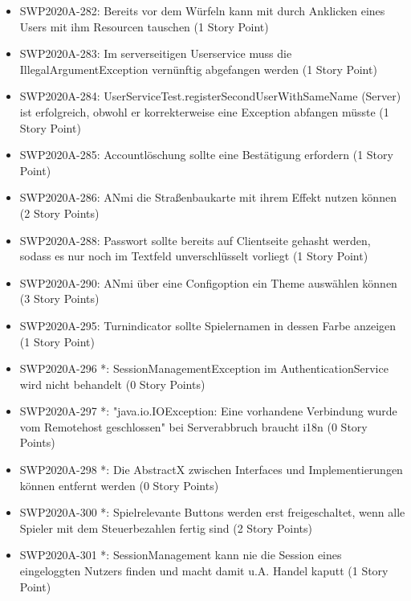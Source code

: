 \documentclass[12pt,a4paper, oneside]{article}
\begin{document}
\begin{itemize}
        \item SWP2020A-282:	Bereits vor dem Würfeln kann mit durch Anklicken eines Users mit ihm Resourcen tauschen (1 Story Point)

        \item SWP2020A-283:	Im serverseitigen Userservice muss die IllegalArgumentException vernünftig abgefangen werden (1 Story Point)

        \item SWP2020A-284:	UserServiceTest.registerSecondUserWithSameName (Server) ist erfolgreich, obwohl er korrekterweise eine Exception abfangen müsste (1 Story Point)

        \item SWP2020A-285:	Accountlöschung sollte eine Bestätigung erfordern (1 Story Point)

        \item SWP2020A-286:	ANmi die Straßenbaukarte mit ihrem Effekt nutzen können (2 Story Points)

        \item SWP2020A-288:	Passwort sollte bereits auf Clientseite gehasht werden, sodass es nur noch im Textfeld unverschlüsselt vorliegt (1 Story Point)

        \item SWP2020A-290:	ANmi über eine Configoption ein Theme auswählen können (3 Story Points)

        \item SWP2020A-295:	Turnindicator sollte Spielernamen in dessen Farbe anzeigen (1 Story Point)

        \item SWP2020A-296 *: SessionManagementException im AuthenticationService wird nicht behandelt (0 Story Points)

        \item SWP2020A-297 *: "java.io.IOException: Eine vorhandene Verbindung wurde vom Remotehost geschlossen" bei Serverabbruch braucht i18n (0 Story Points)

        \item SWP2020A-298 *: Die AbstractX zwischen Interfaces und Implementierungen können entfernt werden (0 Story Points)

        \item SWP2020A-300 *: Spielrelevante Buttons werden erst freigeschaltet, wenn alle Spieler mit dem Steuerbezahlen fertig sind (2 Story Points)

        \item SWP2020A-301 *: SessionManagement kann nie die Session eines eingeloggten Nutzers finden und macht damit u.A. Handel kaputt  (1 Story Point)


\end{itemize}
\end{document}
